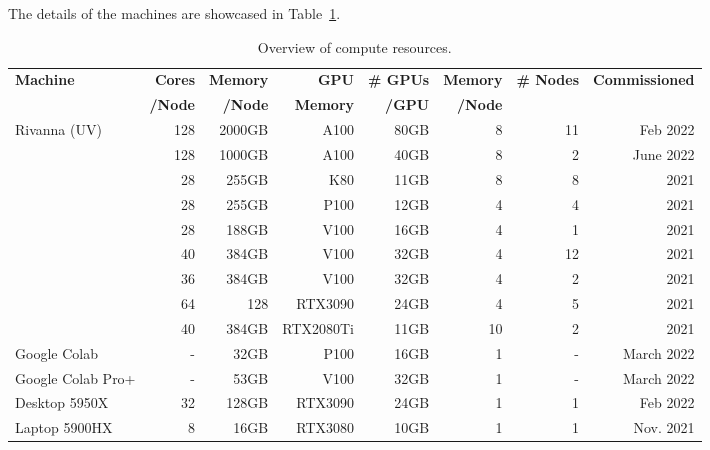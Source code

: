 \documentclass[utf8]{FrontiersinVancouver} %
\begin{document}
The details of the machines are showcased in Table~\ref{tab:hwoverview}.

\begin{table}[htb]
    \caption{Overview of compute resources.}
    \label{tab:hwoverview}
    \begin{center}
    {\footnotesize
    \begin{tabular}{|l|r|r|r|r|r|r|r|}
        \hline
            {\bf Machine}  & {\bf Cores} & {\bf Memory} & {\bf GPU}   &   {\bf \# GPUs} & {\bf Memory} & {\bf \# Nodes}  & {\bf Commissioned} \\ 
                     &  {\bf /Node} & {\bf /Node}  &  {\bf Memory} & {\bf /GPU}     &   {\bf /Node}        & & \\
        \hline
        \hline
         Rivanna (UV)      & 128 & 2000GB    & A100      & 80GB    &  8  & 11 & Feb 2022 \\
                           & 128 & 1000GB    & A100      & 40GB    &  8  &  2 & June 2022     \\
                           &  28 & 255GB     & K80       & 11GB    &  8  &  8 & 2021          \\
                           &  28 & 255GB     & P100      & 12GB    &  4  &  4 & 2021          \\
                           &  28 & 188GB     & V100      & 16GB    &  4  &  1 & 2021          \\
                           &  40 & 384GB     & V100      & 32GB    &  4  & 12 & 2021          \\
                           &  36 & 384GB     & V100      & 32GB    &  4  &  2 & 2021          \\
                           &  64 & 128       & RTX3090   & 24GB    & 4   &  5 & 2021          \\
                           &  40 & 384GB     & RTX2080Ti & 11GB    & 10  &  2 & 2021          \\
         \hline
         Google Colab      & -   & 32GB      & P100      & 16GB    & 1 & - & March 2022 \\
         Google Colab Pro+ & -   & 53GB      & V100      & 32GB    & 1 & - & March 2022 \\
         \hline
         Desktop 5950X     &  32 & 128GB     & RTX3090   & 24GB    & 1 & 1 & Feb 2022   \\
         \hline
         Laptop 5900HX     &   8 & 16GB      & RTX3080   & 10GB    & 1 & 1 & Nov. 2021 \\
         \hline
    \end{tabular}
    }
    \end{center}


\end{table}
\end{document}
